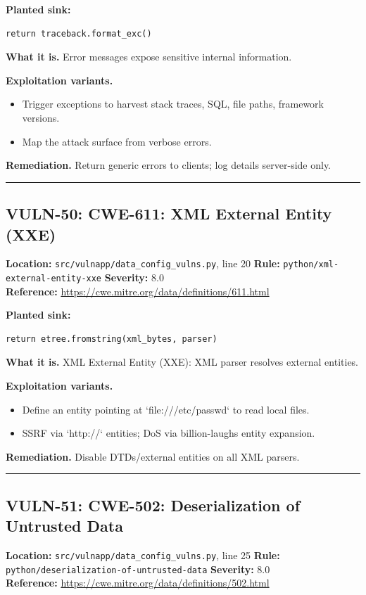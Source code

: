 \documentclass[11pt,a4paper]{article}
\begin{document}
\noindent\textbf{Planted sink:}
\begin{lstlisting}
return traceback.format_exc()
\end{lstlisting}
\noindent\textbf{What it is.} Error messages expose sensitive internal information.

\noindent\textbf{Exploitation variants.}
\begin{itemize}[leftmargin=1.4em,itemsep=1pt,topsep=2pt]
\item Trigger exceptions to harvest stack traces, SQL, file paths, framework versions.
\item Map the attack surface from verbose errors.
\end{itemize}
\noindent\textbf{Remediation.} Return generic errors to clients; log details server-side only.

\vspace{4pt}\hrule\vspace{6pt}
\subsection{VULN-50: CWE-611: XML External Entity (XXE)}
\noindent\textbf{Location:} \texttt{src/vulnapp/data\_config\_vulns.py}, line 20 \quad \textbf{Rule:} \texttt{python/xml-external-entity-xxe} \quad \textbf{Severity:} 8.0
\\ \textbf{Reference:} \url{https://cwe.mitre.org/data/definitions/611.html}

\noindent\textbf{Planted sink:}
\begin{lstlisting}
return etree.fromstring(xml_bytes, parser)
\end{lstlisting}
\noindent\textbf{What it is.} XML External Entity (XXE): XML parser resolves external entities.

\noindent\textbf{Exploitation variants.}
\begin{itemize}[leftmargin=1.4em,itemsep=1pt,topsep=2pt]
\item Define an entity pointing at `file:///etc/passwd` to read local files.
\item SSRF via `http://` entities; DoS via billion-laughs entity expansion.
\end{itemize}
\noindent\textbf{Remediation.} Disable DTDs/external entities on all XML parsers.

\vspace{4pt}\hrule\vspace{6pt}
\subsection{VULN-51: CWE-502: Deserialization of Untrusted Data}
\noindent\textbf{Location:} \texttt{src/vulnapp/data\_config\_vulns.py}, line 25 \quad \textbf{Rule:} \texttt{python/deserialization-of-untrusted-data} \quad \textbf{Severity:} 8.0
\\ \textbf{Reference:} \url{https://cwe.mitre.org/data/definitions/502.html}
\end{document}

